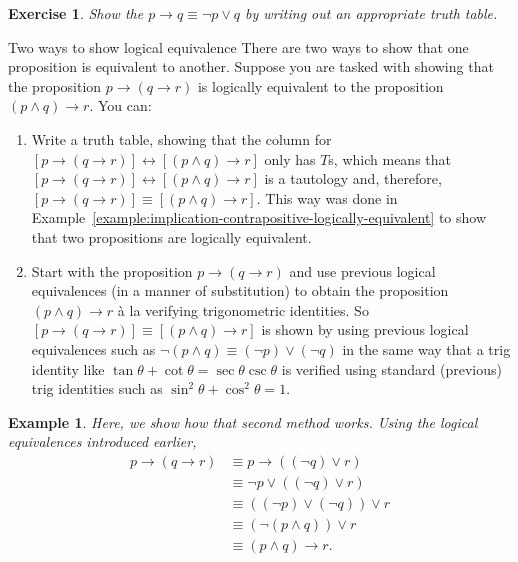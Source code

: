 \documentclass{book}
\newcounter{ekcounter}%
\theoremstyle{ekimcustom}
\newtheorem{example}[ekcounter]{Example}
\newtheorem{exercise}[ekcounter]{Exercise}
\newcommand\defn[1]{{\color{blue}{\bf #1}}}
\begin{document}
\begin{exercise}
Show the \defn{implication conversion law} $p \to q \equiv \neg p \vee q$ by writing out an appropriate truth table.
\end{exercise}


\begin{bmethod}{Two ways to show logical equivalence}{}
There are two ways to show that one proposition is equivalent to another. Suppose you are tasked with showing that the proposition $p \rightarrow (q \rightarrow r)$ is logically equivalent to the proposition $(p \wedge q) \rightarrow r$. You can:
\begin{enumerate}
\item Write a truth table, showing that the column for $[p \rightarrow (q \rightarrow r)] \leftrightarrow [(p \wedge q) \rightarrow r]$ only has $T$s, which means that $[p \rightarrow (q \rightarrow r)] \leftrightarrow [(p \wedge q) \rightarrow r]$ is a tautology and, therefore, $[p \rightarrow (q \rightarrow r)] \equiv [(p \wedge q) \rightarrow r]$. This way was done in Example~\ref{example:implication-contrapositive-logically-equivalent} to show that two propositions are logically equivalent.

\item Start with the proposition $p \rightarrow (q \rightarrow r)$ and use previous logical equivalences (in a manner of substitution) to obtain the proposition $(p \wedge q) \rightarrow r$ \`a la verifying trigonometric identities. So $[p \rightarrow (q \rightarrow r)] \equiv [(p \wedge q) \rightarrow r]$ is shown by using previous logical equivalences such as $\neg (p \wedge q) \equiv (\neg p) \vee (\neg q)$ in the same way that a trig identity like $\tan \theta + \cot \theta = \sec \theta \csc \theta$ is verified using standard (previous) trig identities such as $\sin^2 \theta + \cos^2 \theta = 1$.
\end{enumerate}
\end{bmethod}
\begin{example}
Here, we show how that second method works. Using the logical equivalences introduced earlier,
\begin{align*}
p \rightarrow (q \rightarrow r)
&\equiv p \rightarrow ((\neg q) \vee r)\\
&\equiv \neg p \vee ((\neg q) \vee r)\\
&\equiv ((\neg p) \vee (\neg q)) \vee r\\
&\equiv (\neg (p \wedge q)) \vee r\\
&\equiv (p \wedge q) \rightarrow r.
\end{align*}
\end{example}
\end{document}
